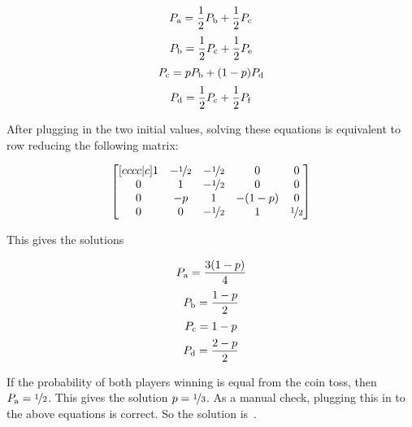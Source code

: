 \documentclass{article}
\begin{document}
\[
P_{\rm{a}}=\frac{1}{2}P_{\rm{b}}+\frac{1}{2}P_{\rm{c}}
\]
\[
P_{\rm{b}}=\frac{1}{2}P_{\rm{c}}+\frac{1}{2}P_{\rm{e}}
\]
\[
P_{\rm{c}}=pP_{\rm{b}}+(1-p)P_{\rm{d}}
\]
\[
P_{\rm{d}}=\frac{1}{2}P_{\rm{c}}+\frac{1}{2}P_{\rm{f}}
\]

After plugging in the two initial values, solving these equations is equivalent to row reducing the following matrix:

\[
\begin{bmatrix}[cccc|c]
1 & -\nicefrac{1}{2} & -\nicefrac{1}{2} & 0      & 0 \\
0 & 1            & -\nicefrac{1}{2} & 0      & 0 \\
0 & -p           & 1            & -(1-p) & 0 \\
0 & 0            & -\nicefrac{1}{2} & 1      & \nicefrac{1}{2}
\end{bmatrix}
\]

This gives the solutions

\[
P_{\rm{a}}=\frac{3(1-p)}{4}
\]
\[
P_{\rm{b}}=\frac{1-p}{2}
\]
\[
P_{\rm{c}}=1-p
\]
\[
P_{\rm{d}}=\frac{2-p}{2}
\]

If the probability of both players winning is equal from the coin toss, then $P_{\rm{a}}=\nicefrac{1}{2}$.
This gives the solution $p=\nicefrac{1}{3}$.
As a manual check, plugging this in to the above equations is correct.
So the solution is
\,.



\end{document}
